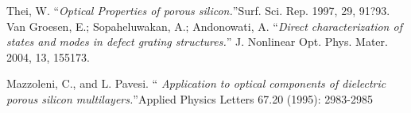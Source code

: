 \documentclass{article}
\begin{document}
\begin{thebibliography}{X}
 Thei, W. \textquotedblleft \emph{Optical Properties of porous silicon.}\textquotedblright Surf. Sci. Rep. 1997, 29, 91?93.
 Van Groesen, E.; Sopaheluwakan, A.; Andonowati,
  A. \textquotedblleft  \emph{Direct characterization of states and
    modes in defect grating structures.}\textquotedblright
  J. Nonlinear Opt. Phys. Mater. 2004, 13, 155173.

 Mazzoleni, C., and L. Pavesi. \textquotedblleft
  \emph{Application to optical components of dielectric porous silicon
    multilayers.}\textquotedblright Applied Physics Letters 67.20
  (1995): 2983-2985

\end{thebibliography}
\end{document}
